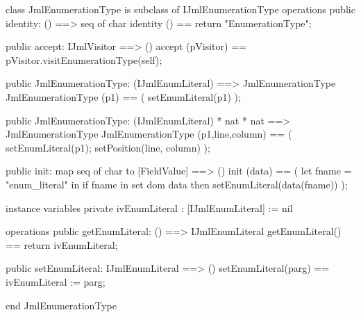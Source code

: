 \begin{vdm_al}
class JmlEnumerationType is subclass of IJmlEnumerationType
operations
  public identity: () ==> seq of char
  identity () == return "EnumerationType";

  public accept: IJmlVisitor ==> ()
  accept (pVisitor) == pVisitor.visitEnumerationType(self);

  public JmlEnumerationType:
    (IJmlEnumLiteral) ==> JmlEnumerationType
  JmlEnumerationType (p1) == 
    ( setEnumLiteral(p1) );

  public JmlEnumerationType:
    (IJmlEnumLiteral) *
    nat *
    nat ==> JmlEnumerationType
  JmlEnumerationType (p1,line,column) == 
    ( setEnumLiteral(p1);
      setPosition(line, column) );

  public init: map seq of char to [FieldValue] ==> ()
  init (data) ==
    ( let fname = "enum_literal" in
        if fname in set dom data
        then setEnumLiteral(data(fname)) );

instance variables
  private ivEnumLiteral : [IJmlEnumLiteral] := nil

operations
  public getEnumLiteral: () ==> IJmlEnumLiteral
  getEnumLiteral() == return ivEnumLiteral;

  public setEnumLiteral: IJmlEnumLiteral ==> ()
  setEnumLiteral(parg) == ivEnumLiteral := parg;

end JmlEnumerationType
\end{vdm_al}

